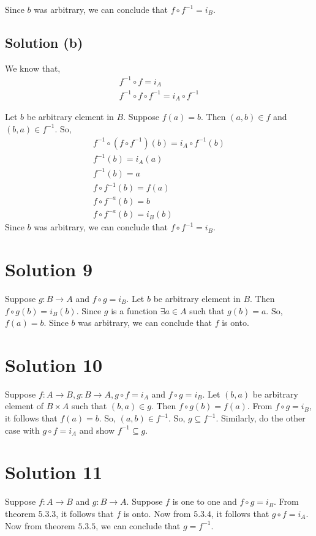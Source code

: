 \documentclass{article}
\begin{document}
Since $b$ was arbitrary, we can conclude that $f \circ f^{-1} = i_B$.

\subsection{Solution (b)}
We know that,
\begin{align*}
  f^{-1} \circ f = i_A \\
  f^{-1} \circ f \circ f^{-1} = i_A \circ f^{-1} 
\end{align*}

Let $b$ be arbitrary element in $B$. Suppose $f(a) = b$. Then $(a,b)
\in f$ and $(b,a) \in f^{-1}$. So,
\begin{align*}
  f^{-1} \circ (f \circ f^{-1})(b) = i_A \circ f^{-1}(b) \\
  f^{-1}(b) = i_A(a) \\
  f^{-1}(b) = a \\
  f \circ f^{-1}(b) = f(a) \tag{Apply f} \\
  f \circ f^{-a} (b) = b \\
  f \circ f^{-a} (b) = i_B(b)
\end{align*}
Since $b$ was arbitrary, we can conclude that $f \circ f^{-1} = i_B$.

\section{Solution 9}
Suppose $g: B \to A$ and $f \circ g = i_B$. Let $b$ be arbitrary
element in $B$. Then $f \circ g(b) = i_B(b)$. Since $g$ is a function
$\exists a \in A$ such that $g(b) = a$. So, $f(a) = b$. Since $b$ was
arbitrary, we can conclude that $f$ is onto.

\section{Solution 10}
Suppose $f: A \to B, g: B \to A, g \circ f = i_A$ and $f \circ g =
i_B$. Let $(b,a)$ be arbitrary element of $B \times A$ such that
$(b,a) \in g$. Then $f \circ g(b) = f(a)$. From $f \circ g = i_B$, it
follows that $f(a) = b$. So, $(a,b) \in f^{-1}$. So, $g \subseteq
f^{-1}$. Similarly, do the other case with $g \circ f = i_A$ and show
$f^{-1} \subseteq g$.

\section{Solution 11}
Suppose $f:A \to B$ and $g:B \to A$. Suppose $f$ is one to one and $f
\circ g = i_B$. From theorem $5.3.3$, it follows that $f$ is onto. Now
from $5.3.4$, it follows that $g \circ f = i_A$. Now from theorem
$5.3.5$, we can conclude that $g = f^{-1}$.
\end{document}
